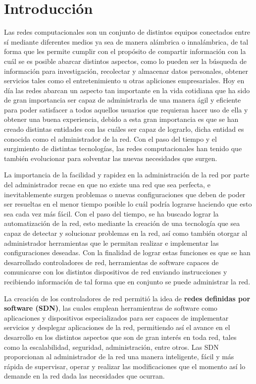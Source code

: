 \setcounter{page}{1}
\section*{Introducción}%

Las redes computacionales son un conjunto 
de distintos equipos conectados entre sí mediante diferentes medios ya sea de manera alámbrica o innalámbrica,
 de tal forma que les permite cumplir con el propósito de compartir información con la cuál se es posible abarcar 
 distintos aspectos, como lo pueden ser la búsqueda de información para investigación, recolectar y almacenar datos personales, 
 obtener servicios tales como el entretenimiento u otras apliciones empresariales. Hoy en día las redes abarcan un aspecto tan 
 importante en la vida cotidiana que ha sido de gran importancia ser capaz de administrarla de una manera ágil y eficiente para 
 poder satisfacer a todos aquellos usuarios que requieran hacer uso de ella y obtener una buena experiencia, 
 debido a esta gran importancia es que se han creado distintas entidades con las cuáles ser capaz de lograrlo, 
 dicha entidad es conocida como el administrador de la red. Con el paso del tiempo y el surgimiento de distintas tecnologías,
  las redes computacionales han tenido que también evolucionar para solventar las nuevas necesidades que surgen.



La importancia de la facilidad y rapidez en la administración de la red por parte del administrador recae en que no existe una 
red que sea perfecta, e inevitablemente surgen problemas o nuevas configuraciones que deben de poder ser resueltas en el menor 
tiempo posible lo cuál podría lograrse haciendo que esto sea cada vez más fácil. Con el paso del tiempo, se ha buscado lograr la
 automatización de la red, esto mediante la creación de una tecnología que sea capaz de detectar y solucionar problemas en la red,
así como también otorgar al administrador
herramientas que le permitan realizar e implementar las configuraciones deseadas. Con la finalidad de lograr estas funciones es 
que se han desarrollado controladores de red, herramientas de software capaces de comunicarse con los distintos dispositivos de red
enviando instrucciones y recibiendo información de tal forma que en conjunto se puede administrar la red.

La creación de los controladores de red permitió la idea de \textbf{redes definidas por software (SDN)}, las cuales emplean 
herramientras de software como aplicaciones y dispositivos especializados para 
ser capaces de implementar servicios y desplegar aplicaciones de la red, permitiendo así el avance en el desarrollo en los
distintos aspectos que son de gran interés en toda red, tales como la escalabilidad, seguridad, administración, entre otros.
Las SDN proporcionan al administrador de la red una manera inteligente, fácil y más rápida de supervisar, operar y realizar
las modificaciones que el momento así lo demande en la red dada las necesidades que ocurran. 

